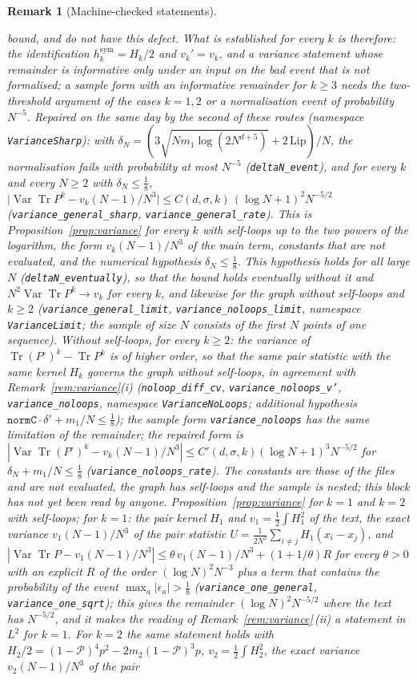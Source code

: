 \documentclass[11pt,a4paper]{article}
\theoremstyle{stmt}
\theoremstyle{defn}
\theoremstyle{rmk}
\newtheorem{remark}[theorem]{Remark}
\numberwithin{equation}{section}
\DeclareMathOperator{\Tr}{Tr}
\begin{document}
{\begin{remark}[Machine-checked statements]
\begin{itemize}
bound, and do not have this defect. What is established for every $k$ is therefore: the identification $h_k^{\mathrm{sym}}=H_k/2$ and $v_k'=v_k$, and a variance statement whose remainder is informative only under an input on the bad event that is not formalised; a sample form with an informative remainder for $k\ge3$ needs the two-threshold argument of the cases $k=1,2$ or a normalisation event of probability $N^{-5}$. \emph{Repaired on the same day} by the second of these routes (namespace \texttt{VarianceSharp}): with $\delta_N=(3\sqrt{N m_1\log(2N^{d+5})}+2\,\mathrm{Lip})/N$, the normalisation fails with probability at most $N^{-5}$ (\texttt{deltaN\_event}), and for every $k$ and every $N\ge2$ with $\delta_N\le\frac18$, $\big|\operatorname{Var}\Tr P^k-v_k(N-1)/N^3\big|\le C(d,\sigma,k)\,(\log N+1)^2N^{-5/2}$ (\texttt{variance\_general\_sharp}, \texttt{variance\_general\_rate}). This is Proposition~\ref{prop:variance} for every $k$ with self-loops up to the two powers of the logarithm, the form $v_k(N-1)/N^3$ of the main term, constants that are not evaluated, and the numerical hypothesis $\delta_N\le\frac18$. This hypothesis holds for all large $N$ (\texttt{deltaN\_eventually}), so that the bound holds eventually without it and $N^2\operatorname{Var}\Tr P^k\to v_k$ for every $k$, and likewise for the graph without self-loops and $k\ge2$ (\texttt{variance\_general\_limit}, \texttt{variance\_noloops\_limit}, namespace \texttt{VarianceLimit}; the sample of size $N$ consists of the first $N$ points of one sequence). Without self-loops, for every $k\ge2$: the variance of $\Tr(P^\circ)^k-\Tr P^k$ is of higher order, so that the same pair statistic with the same kernel $H_k$ governs the graph without self-loops, in agreement with Remark~\ref{rem:variance}(i) (\texttt{noloop\_diff\_cv}, \texttt{variance\_noloops\_v'}, \texttt{variance\_noloops}, namespace \texttt{VarianceNoLoops}; additional hypothesis $\texttt{normC}\cdot\delta'+m_1/N\le\frac18$); the sample form \texttt{variance\_noloops} has the same limitation of the remainder; the repaired form is $|\operatorname{Var}\Tr(P^\circ)^k-v_k(N-1)/N^3|\le C'(d,\sigma,k)(\log N+1)^3N^{-5/2}$ for $\delta_N+m_1/N\le\frac18$ (\texttt{variance\_noloops\_rate}). The constants are those of the files and are not evaluated, the graph has self-loops and the sample is nested; this block has not yet been read by anyone. Proposition~\ref{prop:variance} for $k=1$ and $k=2$ with self-loops; for $k=1$: the pair kernel $H_1$ and $v_1=\frac12\int H_1^2$ of the text, the exact variance $v_1(N-1)/N^3$ of the pair statistic $U=\frac1{2N^2}\sum_{i\ne j}H_1(x_i-x_j)$, and $|\operatorname{Var}\Tr P-v_1(N-1)/N^3|\le\theta\,v_1(N-1)/N^3+(1+1/\theta)R$ for every $\theta>0$ with an explicit $R$ of the order $(\log N)^2N^{-3}$ plus a term that contains the probability of the event $\max_a|\epsilon_a|>\frac18$ (\texttt{variance\_one\_general}, \texttt{variance\_one\_sqrt}); this gives the remainder $(\log N)^2N^{-5/2}$ where the text has $N^{-5/2}$, and it makes the reading of Remark~\ref{rem:variance}\,(ii) a statement in $L^2$ for $k=1$. For $k=2$ the same statement holds with $H_2/2=(1-\mathcal P)^4p^2-2m_2(1-\mathcal P)^3p$, $v_2=\frac12\int H_2^2$, the exact variance $v_2(N-1)/N^3$ of the pair 
\end{itemize}
\end{remark}}
\end{document}

